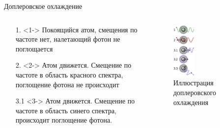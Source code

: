 \documentclass{beamer}
\begin{document}
    \begin{frame}{Доплеровское охлаждение}
        \begin{columns}

        \begin{column}{0.5\textwidth}

            \begin{itemize}
                \item[1.] <1-> Покоящийся атом, смещения по частоте нет, налетающий фотон
                               не поглощается
                \item[2.] <2-> Атом движется. Смещение по частоте в область красного спектра,
                               поглощение фотона не происходит
                \item[3.1] <3-> Атом движется. Смещение по частоте в область синего спектра,
                                происходит поглощение фотона.
            \end{itemize}

        \end{column}

        \begin{column}{0.5\textwidth}
            \begin{figure}
                \centering
                \includegraphics[width=0.35\textwidth]{media/dopler-cooling.png}
                \caption{Иллюстрация доплеровского охлаждения}
            \end{figure}
        \end{column}

        \end{columns}
    \end{frame}
\end{document}
